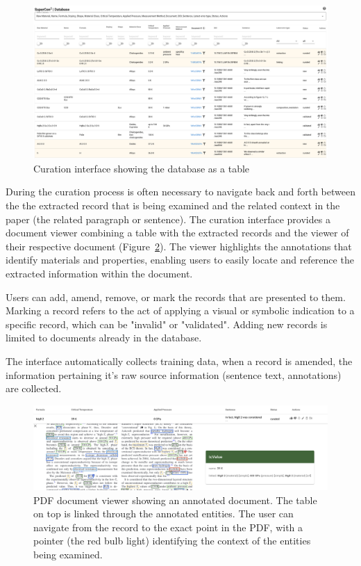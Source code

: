 \documentclass[a4paper]{article}
\begin{document}
\begin{figure}[ht]
  \centering
  \includegraphics[width=1\textwidth]{images/supercon-curation-database} 
  \caption{Curation interface showing the database as a table}
  \label{fig:curation-interface-database}
\end{figure}


During the curation process is often necessary to navigate back and forth between the the extracted record that is being examined and the related context in the paper (the related paragraph or sentence). 
The curation interface provides a document viewer combining a table with the extracted records and the viewer of their respective document (Figure~\ref{fig:pdf-view}). The viewer highlights the annotations that identify materials and properties, enabling users to easily locate and reference the extracted information within the document.

Users can add, amend, remove, or mark the records that are presented to them.  
Marking a record refers to the act of applying a visual or symbolic indication to a specific record, which can be "invalid" or "validated". 
Adding new records is limited to documents already in the database.

The interface automatically collects training data, when a record is amended, the information pertaining it's raw source information (sentence text, annotations) are collected. 

\begin{figure}[ht]
  \centering
  \includegraphics[width=1\textwidth]{images/pdf-view-context.png} 
  \caption{PDF document viewer showing an annotated document. The table on top is linked through the annotated entities. The user can navigate from the record to the exact point in the PDF, with a pointer (the red bulb light) identifying the context of the entities being examined. }
  \label{fig:pdf-view}
\end{figure}
\end{document}

